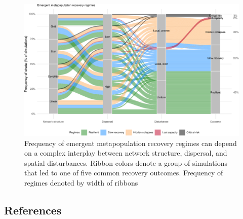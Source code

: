 \documentclass[
]{article}
\begin{document}
\begin{figure}[H]

{\centering \includegraphics{Managing_for_ecological_surprises_in_metapopulations_files/figure-latex/cluster results-1} 

}

\caption{Frequency of emergent metapopulation recovery regimes can depend on a complex interplay between network structure, dispersal, and spatial disturbances. Ribbon colors denote a group of simulations that led to one of five common recovery outcomes. Frequency of regimes denoted by width of ribbons}\label{fig:cluster results}
\end{figure}

\hypertarget{references}{%
\subsection{References}\label{references}}

\vspace{3truemm}
\end{document}
